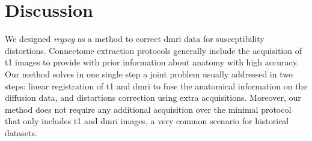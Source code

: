 \section*{Discussion}
\label{sec:discussion}

We designed \emph{regseg} as a method to correct \gls*{dmri} data for susceptibility
  distortions.
Connectome extraction protocols generally include the acquisition of \gls*{t1} images
  to provide with prior information about anatomy with high accuracy.
Our method solves in one single step a joint problem usually addressed in two steps:
  linear registration of \gls*{t1} and \gls*{dmri} to fuse the anatomical information on
  the diffusion data, and distortions correction using extra acquisitions.
Moreover, our method does not require any additional acquisition over the minimal protocol
  that only includes \gls*{t1} and \gls*{dmri} images, a very common scenario for
  historical datasets.

